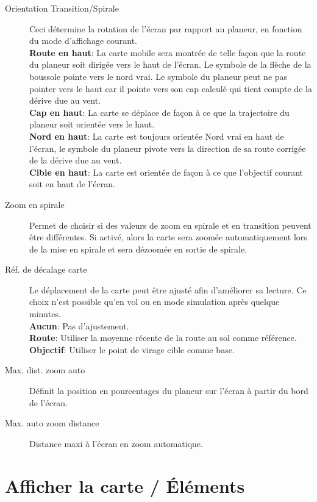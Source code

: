 \begin{description}
\item[Orientation Transition/Spirale]  \label{conf:orientation} Ceci détermine la rotation de l'écran par rapport au planeur, en fonction du mode d'affichage courant. \\
  {\bf Route en haut}: La carte mobile sera montrée de telle façon que la route du planeur soit dirigée vers le haut de l'écran. Le symbole de la flèche de la boussole pointe vers le nord vrai. Le symbole du planeur peut ne pas pointer vers le haut car il pointe vers son cap calculé qui tient compte de la dérive due au vent.\\
  {\bf Cap en haut}: La carte se déplace de façon à ce que la trajectoire du planeur soit orientée vers le haut.\\
  {\bf Nord en haut}: La carte est toujours orientée Nord vrai en haut de l'écran, le symbole du planeur pivote vers la direction de sa route corrigée de la dérive due au vent.\\
  {\bf Cible en haut}: La carte est orientée de façon à ce que l'objectif courant soit en haut de l'écran.
\item[Zoom en spirale]  \label{conf:circlingzoom} Permet de choisir si des valeurs de zoom en spirale et en transition peuvent être différentes. Si activé, alors la carte sera zoomée  automatiquement lors de la mise en spirale et sera dézoomée en sortie de spirale.
\item[Réf. de décalage carte] Le déplacement de la carte peut être ajusté afin d'améliorer sa lecture. Ce choix n'est possible qu'en vol ou en mode simulation après quelque minutes.\\
  {\bf Aucun}: Pas d'ajustement. \\
  {\bf Route}: Utiliser la moyenne récente de la route au sol comme référence.\\
  {\bf Objectif}: Utiliser le point de virage cible comme base.
\item[Max. dist. zoom auto]  \label{conf:gliderposition} Définit la position en pourcentages du planeur sur l'écran à partir du bord de l'écran.
\item[Max. auto zoom distance]  Distance maxi à l'écran en zoom automatique.
\end{description}


\section{Afficher la carte / Éléments}\label{sec:map-elements}

